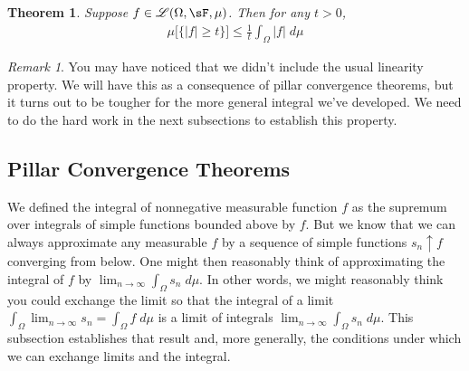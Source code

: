 \documentclass[12pt]{article}
\theoremstyle{plain}
\newtheorem{thm}{Theorem}[section]
\theoremstyle{definition}
\theoremstyle{remark}
\newtheorem*{rmk}{Remark}
\newcommand{\limn}{\lim_{n\rightarrow\infty}}
\begin{document}
\begin{thm}
Suppose $f\in\mathscr{L}(\Omega,\sF,\mu)$. Then for any $t>0$,
\begin{align*}
  \mu\big[\{|f|\geq t\}\big] \leq \frac{1}{t}\int_{\Omega} |f|\; d\mu
\end{align*}
\end{thm}

\begin{rmk}
You may have noticed that we didn't include the usual linearity
property. We will have this as a consequence of pillar convergence
theorems, but it turns out to be tougher for the more general integral
we've developed. We need to do the hard work in the next subsections to
establish this property.
\end{rmk}

\subsection{Pillar Convergence Theorems}

We defined the integral of nonnegative measurable function $f$ as the
supremum over integrals of simple functions bounded above by $f$. But
we know that we can always approximate any measurable $f$ by a sequence
of simple functions $s_n \uparrow f$ converging from below. One might
then reasonably think of approximating the integral of $f$ by
$\limn \int_\Omega s_n \;d\mu$. In other words, we might reasonably
think you could exchange the limit so that the integral of a limit
$\int_\Omega \limn s_n=\int_\Omega f \;d\mu$ is a limit of integrals
$\limn \int_\Omega s_n \;d\mu$. This subsection establishes that result
and, more generally, the conditions under which we can exchange limits
and the integral.
\end{document}
